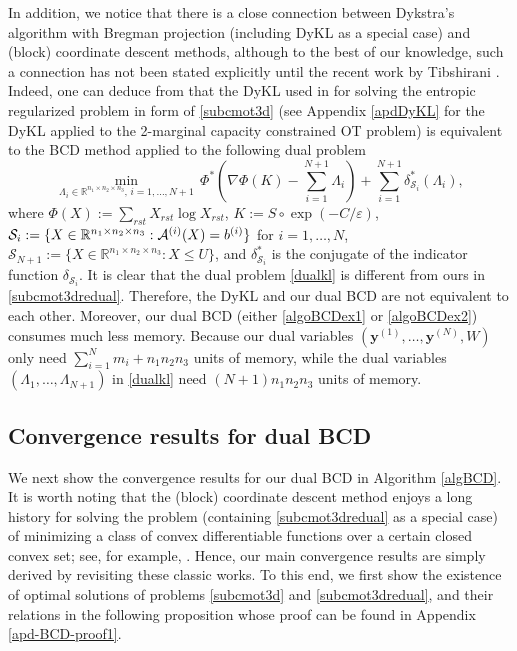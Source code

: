 \documentclass[10pt]{article}
\newcommand{\cA}{{\cal A}}
\begin{document}
In addition, we notice that there is a close connection between Dykstra's algorithm with Bregman projection (including DyKL as a special case) and (block) coordinate descent methods, although to the best of our knowledge, such a connection has not been stated explicitly until the recent work by Tibshirani \cite{t2017dykstra}. Indeed, one can deduce from \cite[Section 5]{t2017dykstra} that the DyKL used in \cite{bccnp2015iterative} for solving the entropic regularized problem in form of \eqref{subcmot3d} (see Appendix \ref{apdDyKL} for the DyKL applied to the 2-marginal capacity constrained OT problem) is equivalent to the BCD method applied to the following dual problem
\begin{equation}\label{dualkl}
\min\limits_{\Lambda_i\in\mathbb{R}^{n_1\times n_2\times n_3}, \,i=1,\dots,N+1}\,\Phi^*\left(\nabla \Phi(K)-{\textstyle\sum^{N+1}_{i=1}}\Lambda_i\right)
+ {\textstyle\sum^{N+1}_{i=1}}\delta_{\mathcal{S}_i}^*(\Lambda_i),
\end{equation}
where $\Phi(X):=\sum_{rst}X_{rst}\log X_{rst}$, $K:=S\circ\exp(-C/\varepsilon)$, $\mathcal{S}_i:=\{X\in\mathbb{R}^{n_1\times n_2\times n_3}:\cA^{(i)}(X) = b^{(i)}\}$ for $i=1,\dots,N$, $\mathcal{S}_{N+1}:=\{X\in\mathbb{R}^{n_1\times n_2\times n_3}: X \leq U\}$, and $\delta_{\mathcal{S}_i}^*$  is the conjugate of the indicator function $\delta_{\mathcal{S}_i}$.
It is clear that the dual problem \eqref{dualkl} is different from ours in \eqref{subcmot3dredual}. Therefore, the DyKL and our dual BCD are not equivalent to each other. Moreover, our dual BCD (either \eqref{algoBCDex1} or \eqref{algoBCDex2}) consumes much less memory. Because our dual variables $(\bm{y}^{(1)},\dots,\bm{y}^{(N)},W)$ only need $\sum^N_{i=1}m_i+n_1n_2n_3$ units of memory, while the dual variables $(\Lambda_1,\dots,\Lambda_{N+1})$ in \eqref{dualkl} need $(N+1)n_1n_2n_3$ units of memory.







\subsection{Convergence results for dual BCD}

We next show the convergence results for our dual BCD in Algorithm \ref{algBCD}. It is worth noting that the (block) coordinate descent method enjoys a long history for solving the problem (containing \eqref{subcmot3dredual} as a special case) of minimizing a class of convex differentiable functions over a certain closed convex set; see, for example, \cite{lt1992convergence,lt1993convergence,tseng1993dual}. Hence, our main convergence results are simply derived by revisiting these classic works. To this end, we first show the existence of optimal solutions of problems \eqref{subcmot3d} and \eqref{subcmot3dredual}, and their relations in the following proposition whose proof can be found in Appendix \ref{apd-BCD-proof1}.
\end{document}
